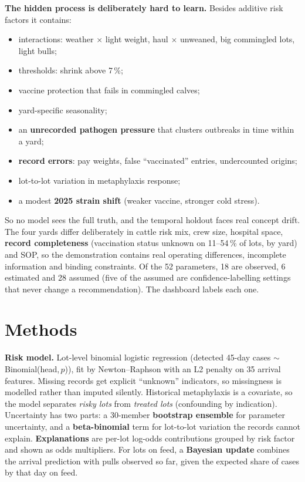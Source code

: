 \documentclass[10pt,letterpaper]{article}
\newcommand{\pct}{\,\%}
\newcommand{\lead}[1]{\textbf{#1}\enspace}
\begin{document}
\lead{The hidden process is deliberately hard to learn.} Besides additive risk factors it contains:
\begin{itemize}
  \item interactions: weather $\times$ light weight, haul $\times$ unweaned, big commingled lots, light bulls;
  \item thresholds: shrink above 7\pct;
  \item vaccine protection that fails in commingled calves;
  \item yard-specific seasonality;
  \item an \textbf{unrecorded pathogen pressure} that clusters outbreaks in time within a yard;
  \item \textbf{record errors}: pay weights, false ``vaccinated'' entries, undercounted origins;
  \item lot-to-lot variation in metaphylaxis response;
  \item a modest \textbf{2025 strain shift} (weaker vaccine, stronger cold stress).
\end{itemize}

So no model sees the full truth, and the temporal holdout faces real concept drift. The four yards differ deliberately in cattle risk mix, crew size, hospital space, \textbf{record completeness} (vaccination status unknown on 11--54\pct{} of lots, by yard) and SOP, so the demonstration contains real operating differences, incomplete information and binding constraints. Of the 52 parameters, 18 are observed, 6 estimated and 28 assumed (five of the assumed are confidence-labelling settings that never change a recommendation). The dashboard labels each one.

\section{Methods}

\lead{Risk model.} Lot-level binomial logistic regression (detected 45-day cases $\sim$ Binomial(head,\,$p$)), fit by Newton--Raphson with an L2 penalty on 35 arrival features. Missing records get explicit ``unknown'' indicators, so missingness is modelled rather than imputed silently. Historical metaphylaxis is a covariate, so the model separates \emph{risky lots} from \emph{treated lots} (confounding by indication). Uncertainty has two parts: a 30-member \textbf{bootstrap ensemble} for parameter uncertainty, and a \textbf{beta-binomial} term for lot-to-lot variation the records cannot explain. \textbf{Explanations} are per-lot log-odds contributions grouped by risk factor and shown as odds multipliers. For lots on feed, a \textbf{Bayesian update} combines the arrival prediction with pulls observed so far, given the expected share of cases by that day on feed.
\end{document}
